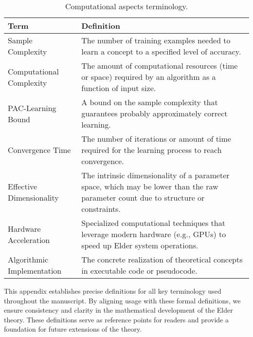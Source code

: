 \begin{table}[h]
\centering
\begin{tabular}{|l|p{12cm}|}
\hline
\textbf{Term} & \textbf{Definition} \\
\hline
Sample Complexity & The number of training examples needed to learn a concept to a specified level of accuracy. \\
\hline
Computational Complexity & The amount of computational resources (time or space) required by an algorithm as a function of input size. \\
\hline
PAC-Learning Bound & A bound on the sample complexity that guarantees probably approximately correct learning. \\
\hline
Convergence Time & The number of iterations or amount of time required for the learning process to reach convergence. \\
\hline
Effective Dimensionality & The intrinsic dimensionality of a parameter space, which may be lower than the raw parameter count due to structure or constraints. \\
\hline
Hardware Acceleration & Specialized computational techniques that leverage modern hardware (e.g., GPUs) to speed up Elder system operations. \\
\hline
Algorithmic Implementation & The concrete realization of theoretical concepts in executable code or pseudocode. \\
\hline
\end{tabular}
\caption{Computational aspects terminology.}
\label{tab:computational_terminology}
\end{table}

This appendix establishes precise definitions for all key terminology used throughout the manuscript. By aligning usage with these formal definitions, we ensure consistency and clarity in the mathematical development of the Elder theory. These definitions serve as reference points for readers and provide a foundation for future extensions of the theory.